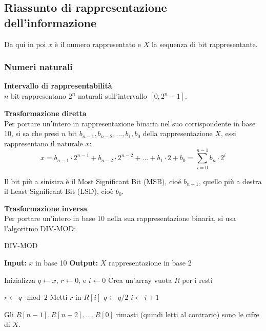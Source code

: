\documentclass[a4paper,11pt]{article}
\begin{document}
\subsection{Riassunto di rappresentazione dell'informazione}

Da qui in poi $x$ è il numero rappresentato e $X$ la sequenza di bit rappresentante.

\subsubsection{Numeri naturali}

\textbf{\textsf{Intervallo di rappresentabilità}} \\
$n$ bit rappresentano $2^n$ naturali sull'intervallo $[0, 2^n- 1]$.

\par\medskip
\noindent
\textbf{\textsf{Trasformazione diretta}} \\
Per portare un'intero in rappresentazione binaria nel suo corrispondente in base 10, si sa che presi $n$ bit $b_{n-1}, b_{n-2}, ... , b_1, b_0$ della rappresentazione $X$, essi rappresentano il naturale $x$:
$$
x =  b_{n-1} \cdot 2^{n-1} + b_{n-2} \cdot 2^{n-2} + ... + b_1 \cdot 2 + b_0 = \sum_{i=0}^{n-1} b_n \cdot 2^i
$$

Il bit più a sinistra è il Most Significant Bit (MSB), cioé $b_{n-1}$, quello più a destra il Least Significant Bit (LSD), cioè $b_0$.

\par\medskip
\noindent
\textbf{\textsf{Trasformazione inversa}} \\
Per portare un'intero in base 10 nella sua rappresentazione binaria, si usa l'algoritmo DIV-MOD:

\begin{algorithm}
\caption{DIV-MOD}
\begin{algorithmic} %
    \STATE \textbf{Input:} $x$ in base 10
    \STATE \textbf{Output:} $X$ rappresentazione in base 2
    
    \STATE Inizializza $q \gets x$, $r \gets 0$, e $i \gets 0$ %
    \STATE Crea un'array vuota $R$ per i resti 

        \STATE $r \gets q \mod 2$ %
        \STATE Metti $r$ in $R[i]$ %
        \STATE $q \gets q / 2$ %
        \STATE $i \gets i + 1$ %
    \ENDWHILE
    
    \STATE Gli $R[n-1], R[n-2], ..., R[0]$ rimasti (quindi letti al contrario) sono le cifre di $X$.
\end{algorithmic}
\end{algorithm}
\end{document}
